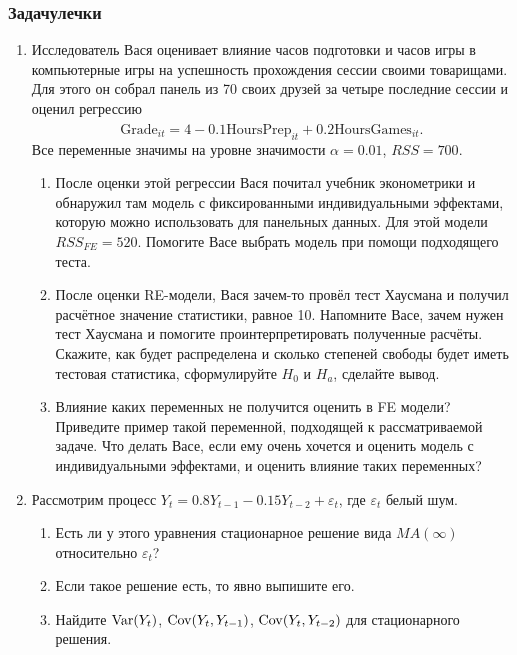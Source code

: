 \subsubsection*{Задачулечки}

\begin{enumerate}
  \item Исследователь Вася оценивает влияние часов подготовки и часов игры в компьютерные игры на успешность прохождения сессии своими товарищами. 
  Для этого он собрал панель из 70 своих
  друзей за четыре последние сессии и оценил регрессию 
  \[
  \widehat{\text{Grade}}_{it} =4 - 0.1 \text{HoursPrep}_{it} + 0.2 \text{HoursGames}_{it}.
  \]
  Все переменные значимы на уровне значимости $\alpha=0.01$, $RSS=700$.

  \begin{enumerate}
    \item После оценки этой регрессии Вася почитал учебник эконометрики и обнаружил там модель с фиксированными индивидуальными эффектами, 
    которую можно использовать для панельных данных. 
    Для этой модели $RSS_{FE}=520$. 
    Помогите Васе выбрать модель при помощи подходящего теста.
    \item После оценки RE-модели, Вася зачем-то провёл тест Хаусмана и получил расчётное значение статистики, равное 10. 
    Напомните Васе, зачем нужен тест Хаусмана и помогите проинтерпретировать полученные расчёты.
    Скажите, как будет распределена и сколько степеней свободы будет иметь тестовая статистика, сформулируйте $H_0$ и $H_a$, сделайте вывод.
    \item Влияние каких переменных не получится оценить в FE модели? 
    Приведите пример такой переменной, подходящей к рассматриваемой задаче. 
    Что делать Васе, если ему очень хочется и оценить модель с индивидуальными эффектами, и оценить влияние таких переменных?
  \end{enumerate}
  
  \item Рассмотрим процесс $Y_{t}=0.8 Y_{t-1}-0.15 Y_{t-2}+\varepsilon_t$, где $\varepsilon_t$ белый шум.
  \begin{enumerate}
    \item Есть ли у этого уравнения стационарное решение вида $MA(\infty)$ относительно $\varepsilon_t$?
    \item Если такое решение есть, то явно выпишите его.
    \item Найдите $\operatorname{Var}(Y_t)$, $\operatorname{Cov}(Y_t, Y_{t-1})$, $\operatorname{Cov}(Y_t, Y_{t-2})$ для стационарного решения.
  \end{enumerate}


\end{enumerate}
